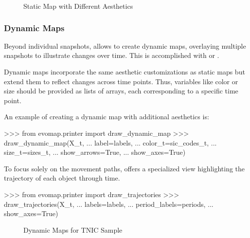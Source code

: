 \documentclass[article]{jss}
\begin{document}
\begin{figure}[hbt!]
  \centering
  \caption{\label{fig:draw-map-illustrations} Static Map with Different Aesthetics}
\end{figure}
  
\subsubsection{Dynamic Maps}

Beyond individual snapshots,  allows to create dynamic maps, 
overlaying multiple snapshots to illustrate changes over time. 
This is accomplished with  or .

Dynamic maps incorporate the same aesthetic customizations as static maps but extend them to reflect changes 
across time points. Thus, variables like color or size should be provided as lists of arrays, each corresponding
 to a specific time point.

An example of creating a dynamic map with additional aesthetics is:

\begin{CodeChunk}
\begin{CodeInput}
>>> from evomap.printer import draw_dynamic_map
>>> draw_dynamic_map(X_t,
...     label=labels,
...     color_t=sic_codes_t,
...     size_t=sizes_t,
...     show_arrows=True,
...     show_axes=True)  
\end{CodeInput}
\end{CodeChunk}

To focus solely on the movement paths,  
offers a specialized view highlighting the trajectory of each object through time.

\begin{CodeChunk}
\begin{CodeInput}
>>> from evomap.printer import draw_trajectories
>>> draw_trajectories(X_t,
...     labels=labels,
...     period_labels=periods,
...     show_axes=True)  
\end{CodeInput}
\end{CodeChunk}

\begin{figure}[hbt!]
  \centering
  \caption{\label{fig:draw-dynamic-map-and-trajectories} Dynamic Maps for TNIC Sample}
\end{figure}
\end{document}
